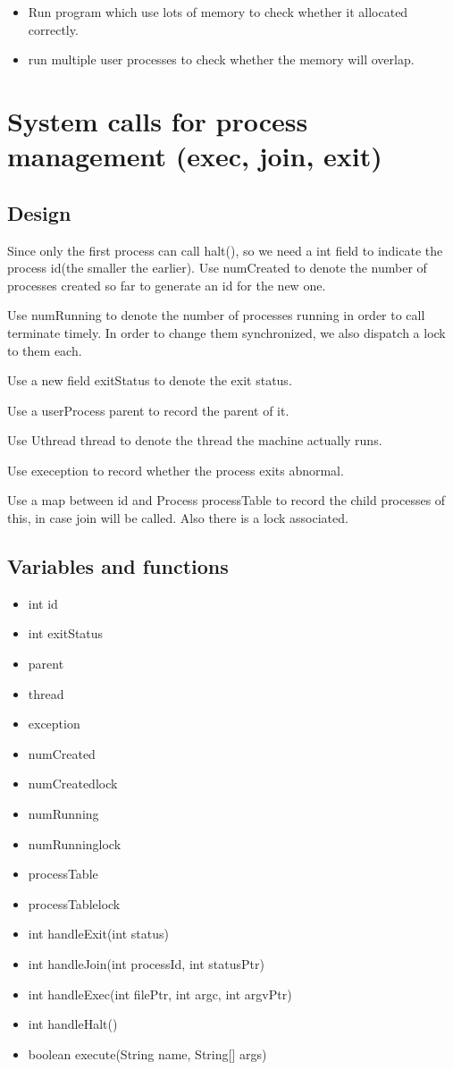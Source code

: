 \documentclass[a4paper,10pt]{article}
\begin{document}
\begin{itemize}
\item Run program which use lots of memory to check whether it allocated correctly.
\item run multiple user processes to check whether the memory will overlap.
\end{itemize}

\section{System calls for process management (exec, join, exit)}

\subsection{Design}
Since only the first process can call halt(), so we need a int field to indicate the process id(the smaller the earlier). Use numCreated to denote the number of processes created so far to generate an id for the new one.

Use numRunning to denote the number of processes running in order to call terminate timely. In order to change them synchronized, we also dispatch a lock to them each.

Use a new field exitStatus to denote the exit status.

Use a userProcess parent to record the parent of it.

Use Uthread thread to denote the thread the machine actually runs.

Use exeception to record whether the process exits abnormal.

Use a map between id and Process processTable to record the child processes of this, in case join will be called. Also there is a lock associated.
\subsection{Variables and functions}
\begin{itemize}
\item int id
\item int exitStatus
\item parent
\item thread
\item exception
\item numCreated
\item numCreatedlock
\item numRunning
\item numRunninglock
\item processTable
\item processTablelock
\item int handleExit(int status)
\item int handleJoin(int processId, int statusPtr)
\item int handleExec(int filePtr, int argc, int argvPtr)
\item int handleHalt()
\item boolean execute(String name, String[] args)
\end{itemize}
\end{document}
